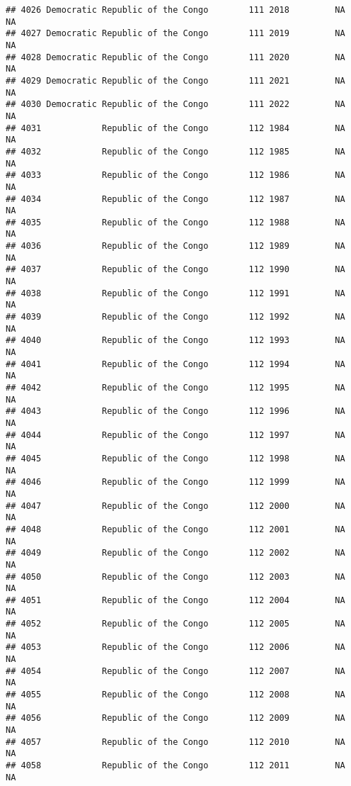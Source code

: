 \documentclass[
]{article}
\begin{document}
\begin{verbatim}
## 4026 Democratic Republic of the Congo        111 2018         NA         NA
## 4027 Democratic Republic of the Congo        111 2019         NA         NA
## 4028 Democratic Republic of the Congo        111 2020         NA         NA
## 4029 Democratic Republic of the Congo        111 2021         NA         NA
## 4030 Democratic Republic of the Congo        111 2022         NA         NA
## 4031            Republic of the Congo        112 1984         NA         NA
## 4032            Republic of the Congo        112 1985         NA         NA
## 4033            Republic of the Congo        112 1986         NA         NA
## 4034            Republic of the Congo        112 1987         NA         NA
## 4035            Republic of the Congo        112 1988         NA         NA
## 4036            Republic of the Congo        112 1989         NA         NA
## 4037            Republic of the Congo        112 1990         NA         NA
## 4038            Republic of the Congo        112 1991         NA         NA
## 4039            Republic of the Congo        112 1992         NA         NA
## 4040            Republic of the Congo        112 1993         NA         NA
## 4041            Republic of the Congo        112 1994         NA         NA
## 4042            Republic of the Congo        112 1995         NA         NA
## 4043            Republic of the Congo        112 1996         NA         NA
## 4044            Republic of the Congo        112 1997         NA         NA
## 4045            Republic of the Congo        112 1998         NA         NA
## 4046            Republic of the Congo        112 1999         NA         NA
## 4047            Republic of the Congo        112 2000         NA         NA
## 4048            Republic of the Congo        112 2001         NA         NA
## 4049            Republic of the Congo        112 2002         NA         NA
## 4050            Republic of the Congo        112 2003         NA         NA
## 4051            Republic of the Congo        112 2004         NA         NA
## 4052            Republic of the Congo        112 2005         NA         NA
## 4053            Republic of the Congo        112 2006         NA         NA
## 4054            Republic of the Congo        112 2007         NA         NA
## 4055            Republic of the Congo        112 2008         NA         NA
## 4056            Republic of the Congo        112 2009         NA         NA
## 4057            Republic of the Congo        112 2010         NA         NA
## 4058            Republic of the Congo        112 2011         NA         NA

\end{verbatim}
\end{document}
